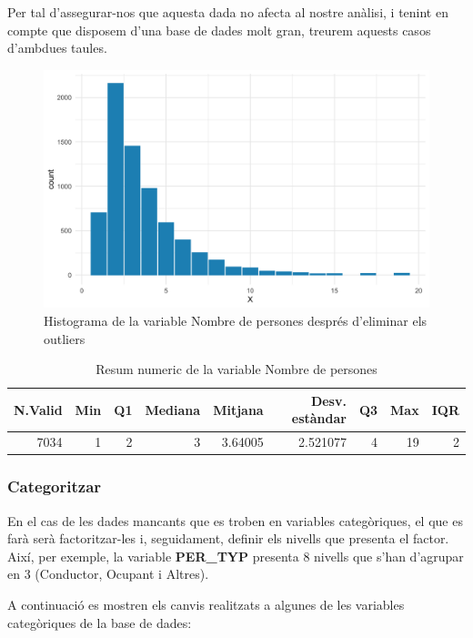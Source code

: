 \documentclass[12pt,longbibliography]{article}
\theoremstyle{definition}
\theoremstyle{remark}
\begin{document}
Per tal d'assegurar-nos que aquesta dada no afecta al nostre anàlisi, i tenint en compte que disposem d'una base de dades molt gran, treurem aquests casos d'ambdues taules. 


\begin{figure}[H]
\begin{center}
\includegraphics[width=12.5cm]{Figura2}
\end{center}
\caption{Histograma de la variable Nombre de persones després d'eliminar els outliers}
\label{fig:F2}
\end{figure}

\begin{table}[H]
\centering
\begin{tabular}{|r|r|r|r|r|r|r|r|r|}
\hline
N.Valid & Min & Q1 & Mediana & Mitjana  & Desv. estàndar & Q3 & Max & IQR \\ \hline
7034    & 1   & 2  & 3       & 3.64005 & 2.521077       & 4  & 19  & 2   \\ \hline
\end{tabular}
\caption{Resum numeric de la variable Nombre de persones}
\label{tab:Fig2-table}
\end{table}

\subsubsection{Categoritzar}

En el cas de les dades mancants que es troben en variables categòriques, el que es farà serà factoritzar-les i, seguidament, definir els nivells que presenta el factor. Així, per exemple, la variable \textbf{PER\_TYP} presenta 8 nivells que s'han d'agrupar en 3 (Conductor, Ocupant i Altres). 


A continuació es mostren els canvis realitzats a algunes de les variables categòriques de la base de dades:
\end{document}
